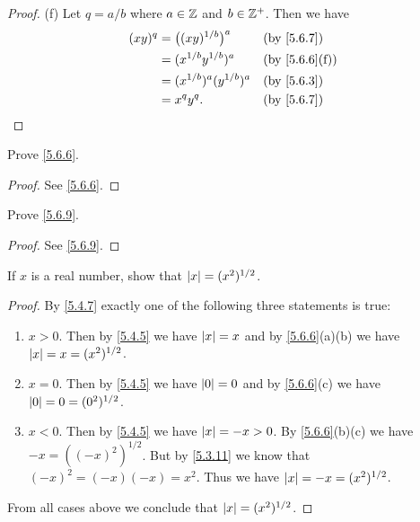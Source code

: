 \begin{proof}{(f)}
  Let \(q = a / b\) where \(a \in \mathbb{Z}\) and \(b \in \mathbb{Z}^+\).
  Then we have
  \begin{align*}
    (xy)^q & = \big((xy)^{1 / b}\big)^a    &  & \text{(by \cref{5.6.7})}    \\
           & = (x^{1 / b} y^{1 / b})^a     &  & \text{(by \cref{5.6.6}(f))} \\
           & = (x^{1 / b})^a (y^{1 / b})^a &  & \text{(by \cref{5.6.3})}    \\
           & = x^q y^q.                    &  & \text{(by \cref{5.6.7})}
  \end{align*}
\end{proof}

\exercisesection

\begin{ex}\label{ex:5.6.1}
  Prove \cref{5.6.6}.
\end{ex}

\begin{proof}
  See \cref{5.6.6}.
\end{proof}

\begin{ex}\label{ex:5.6.2}
  Prove \cref{5.6.9}.
\end{ex}

\begin{proof}
  See \cref{5.6.9}.
\end{proof}

\begin{ex}\label{ex:5.6.3}
  If \(x\) is a real number, show that \(\left\lvert x\right\rvert = (x^2)^{1 / 2}\).
\end{ex}

\begin{proof}
  By \cref{5.4.7} exactly one of the following three statements is true:
  \begin{enumerate}
    \item \(x > 0\).
          Then by \cref{5.4.5} we have \(\left\lvert x\right\rvert = x\) and by \cref{5.6.6}(a)(b) we have \(\left\lvert x\right\rvert = x = (x^2)^{1 / 2}\).
    \item \(x = 0\).
          Then by \cref{5.4.5} we have \(\left\lvert0\right\rvert = 0\) and by \cref{5.6.6}(c) we have \(\left\lvert0\right\rvert = 0 = (0^2)^{1 / 2}\).
    \item \(x < 0\).
          Then by \cref{5.4.5} we have \(\left\lvert x\right\rvert = -x > 0\).
          By \cref{5.6.6}(b)(c) we have \(-x = ((-x)^2)^{1 / 2}\).
          But by \cref{5.3.11} we know that \((-x)^2 = (-x)(-x) = x^2\).
          Thus we have \(\left\lvert x\right\rvert = -x = (x^2)^{1 / 2}\).
  \end{enumerate}
  From all cases above we conclude that \(\left\lvert x\right\rvert = (x^2)^{1 / 2}\).
\end{proof}